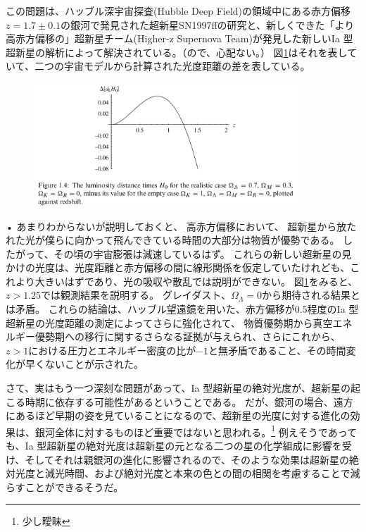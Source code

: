 \documentclass[11pt,a4paper,dvipdfmx]{jsarticle}
\theoremstyle{plain}
\theoremstyle{break}
\begin{document}
この問題は、ハッブル深宇宙探査(Hubble Deep Field)の領域中にある赤方偏移$z = 1.7 \pm 0.1$の銀河で発見された超新星SN1997ffの研究と、新しくできた「より高赤方偏移の」超新星チーム(Higher-z Supernova Team)が発見した新しいIa 型超新星の解析によって解決されている。（ので、心配ない。）
図\ref{fig:1-4}はそれを表していて、二つの宇宙モデルから計算された光度距離の差を表している。
\begin{figure}[h]
	\centering
	\includegraphics[width=10cm]{figure/fig1-4}
	\label{fig:1-4}
	\caption{}
\end{figure}•%
あまりわからないが説明しておくと、
高赤方偏移において、
超新星から放たれた光が僕らに向かって飛んできている時間の大部分は物質が優勢である。
したがって、その頃の宇宙膨張は減速しているはず。
これらの新しい超新星の見かけの光度は、光度距離と赤方偏移の間に線形関係を仮定していたけれども、これより大きいはずであり、光の吸収や散乱では説明ができない。
図\ref{fig:1-4}をみると、$z>1.25$では観測結果を説明する。
グレイダスト、$\Omega_{\Lambda} = 0$から期待される結果とは矛盾。
これらの結論は、ハッブル望遠鏡を用いた、赤方偏移が$0.5$程度のIa 型超新星の光度距離の測定によってさらに強化されて、
物質優勢期から真空エネルギー優勢期への移行に関するさらなる証拠が与えられ、さらにこれから、$z>1$における圧力とエネルギー密度の比が$-1$と無矛盾であること、その時間変化が早くないことが示された。

さて、実はもう一つ深刻な問題があって、Ia 型超新星の絶対光度が、超新星の起こる時期に依存する可能性があるということである。
だが、銀河の場合、遠方にあるほど早期の姿を見ていることになるので、超新星の光度に対する進化の効果は、銀河全体に対するものほど重要ではないと思われる。\footnote{少し曖昧}
例えそうであっても、Ia 型超新星の絶対光度は超新星の元となる二つの星の化学組成に影響を受け、そしてそれは親銀河の進化に影響されるので、そのような効果は超新星の絶対光度と減光時間、および絶対光度と本来の色との間の相関を考慮することで減らすことができるそうだ。
\end{document}
